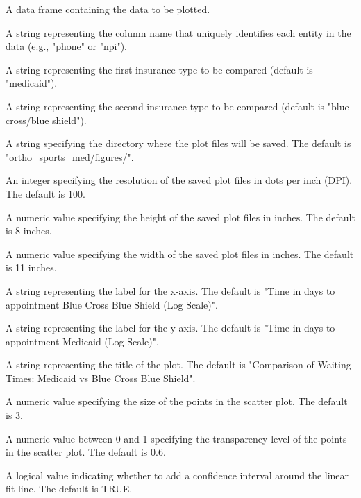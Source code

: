 \documentclass[a4paper]{book}
\begin{document}
%
\begin{Arguments}
\begin{ldescription}
\item[\code{df}] A data frame containing the data to be plotted.

\item[\code{unique\_variable}] A string representing the column name that uniquely identifies each entity in the data (e.g., "phone" or "npi").

\item[\code{insurance1}] A string representing the first insurance type to be compared (default is "medicaid").

\item[\code{insurance2}] A string representing the second insurance type to be compared (default is "blue cross/blue shield").

\item[\code{output\_directory}] A string specifying the directory where the plot files will be saved. The default is "ortho\_sports\_med/figures/".

\item[\code{dpi}] An integer specifying the resolution of the saved plot files in dots per inch (DPI). The default is 100.

\item[\code{height}] A numeric value specifying the height of the saved plot files in inches. The default is 8 inches.

\item[\code{width}] A numeric value specifying the width of the saved plot files in inches. The default is 11 inches.

\item[\code{x\_label}] A string representing the label for the x-axis. The default is "Time in days to appointment Blue Cross Blue Shield (Log Scale)".

\item[\code{y\_label}] A string representing the label for the y-axis. The default is "Time in days to appointment Medicaid (Log Scale)".

\item[\code{plot\_title}] A string representing the title of the plot. The default is "Comparison of Waiting Times: Medicaid vs Blue Cross Blue Shield".

\item[\code{point\_size}] A numeric value specifying the size of the points in the scatter plot. The default is 3.

\item[\code{point\_alpha}] A numeric value between 0 and 1 specifying the transparency level of the points in the scatter plot. The default is 0.6.

\item[\code{add\_confidence\_interval}] A logical value indicating whether to add a confidence interval around the linear fit line. The default is TRUE.
\end{ldescription}
\end{Arguments}
\end{document}

